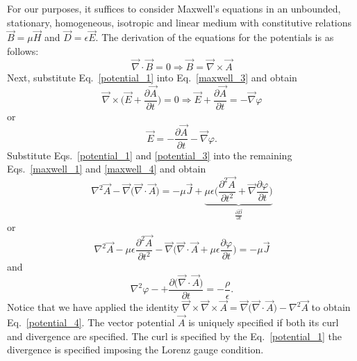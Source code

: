 \documentclass[12pt,a4paper,oneside]{book}
\begin{document}
\begin{onehalfspace}
For our purposes, it suffices to consider Maxwell's equations in an unbounded, stationary, homogeneous, isotropic and linear medium with constitutive relations $\vec{B}=\mu\vec{H}$ and $\vec{D}=\epsilon\vec{E}$. The derivation of the equations for the potentials is as follows:
 \begin{equation}\label{potential_1}
 	\vec{\nabla} \cdot \vec{B} = 0 \Rightarrow \vec{B} = \vec{\nabla}\times\vec{A}
 \end{equation}
Next, substitute Eq.~\eqref{potential_1} into Eq.~\eqref{maxwell_3} and obtain
 \begin{equation*}\label{potential_2}
	\vec{\nabla} \times \Big(\vec{E}+\frac{\partial \vec{A}}{\partial t}\Big) = 0 \Rightarrow \vec{E}+\frac{\partial \vec{A}}{\partial t} = -\vec{\nabla}\varphi
\end{equation*}
or 
 \begin{equation}\label{potential_3}
	\vec{E} =  -\frac{\partial \vec{A}}{\partial t} -\vec{\nabla}\varphi.
\end{equation}
Substitute Eqs.~\eqref{potential_1} and \ref{potential_3} into the remaining Eqs.~\eqref{maxwell_1} and \ref{maxwell_4} and obtain
\begin{equation}\label{potential_4}
	\nabla^2\vec{A}-\vec{\nabla}\big(\vec{\nabla}\cdot\vec{A}\big) = -\mu\vec{J}+\underbrace{\mu\epsilon\Big(\frac{\partial^2\vec{A}}{\partial t^2}+\vec{\nabla}\frac{\partial \varphi}{\partial t}\Big)}_{\frac{\partial\vec{D}}{\partial t}}
\end{equation}
or
\begin{equation}\label{potential_5}
	\nabla^2\vec{A}-\mu\epsilon\frac{\partial^2\vec{A}}{\partial t^2} - \vec{\nabla}\Big(\vec{\nabla}\cdot\vec{A}+\mu\epsilon\frac{\partial\varphi}{\partial t}\Big) = -\mu\vec{J}
\end{equation}
and
\begin{equation}\label{potential_6}
	\nabla^2\varphi-+ \frac{\partial \big(\vec{\nabla}\cdot\vec{A}\big)}{\partial t} = -\frac{\rho}{\epsilon}.
\end{equation}
Notice that we have applied the identity $\vec{\nabla}\times\vec{\nabla}\times\vec{A} = \vec{\nabla}\big(\vec{\nabla}\cdot\vec{A}\big)-\nabla^2\vec{A}$ to obtain Eq.~\eqref{potential_4}. The vector potential $\vec{A}$ is uniquely specified if both its curl and divergence are specified. The curl is specified by the Eq.~\eqref{potential_1} the divergence is specified imposing the Lorenz gauge condition.
\begin{equation}\label{potential_7}

\end{equation}
\end{onehalfspace}
\end{document}
